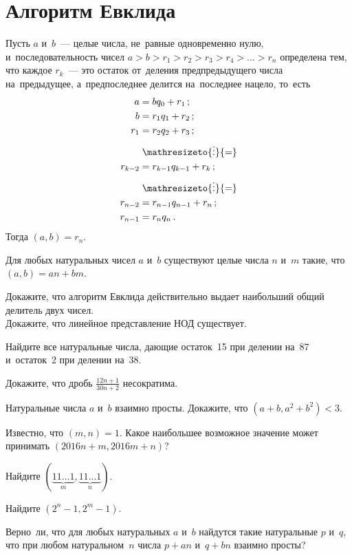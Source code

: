 
\section*{Алгоритм Евклида}


Пусть $a$ и~$b$~--- целые числа, не~равные одновременно нулю,
и~последовательность чисел
$a > b > r_{1} > r_{2} > r_{3} > r_{4} > \ldots > r_{n}$
определена тем, что каждое $r_k$~--- это остаток от~деления предпредыдущего
числа на~предыдущее, а~предпоследнее делится на~последнее нацело, то~есть
\begin{align*}
    a &= b q_0 + r_1
\, ; \\
    b &= r_1 q_1 + r_2
\, ; \\
    r_{1} &= r_2q_2 + r_3
\, ; \\ & \mathrel{\mathresizeto{\vdots}{=}} \\
    r_{k-2} &= r_{k-1} q_{k-1} + r_{k}
\, ; \\ & \mathrel{\mathresizeto{\vdots}{=}} \\
    r_{n-2} &= r_{n-1} q_{n-1} + r_n
\, ; \\
    r_{n-1} &= r_{n} q_{n}
\, . \end{align*}
Тогда $(a, b) = r_{n}$.

Для любых натуральных чисел $a$ и~$b$ существуют целые числа $n$ и~$m$ такие,
что $(a, b) = a n + b m$.

\begin{problems}

\subproblem
Докажите, что алгоритм Евклида действительно выдает наибольший общий делитель
двух чисел.
\\
\subproblem
Докажите, что линейное представление НОД существует.

\item
Найдите все натуральные числа, дающие остаток~15 при делении на~87 и~остаток~2
при делении на~38.

\item
Докажите, что дробь $\frac{12 n + 1}{30 n + 2}$ несократима.

\item
Натуральные числа $a$ и~$b$ взаимно просты.
Докажите, что $(a + b, a^2 + b^2) < 3$.

\item
Известно, что $(m, n) = 1$.
Какое наибольшее возможное значение может принимать $(2016 n + m, 2016 m + n)$?

\item
Найдите $(\underbrace{11 \ldots 1}_{m}, \underbrace{11 \ldots 1}_{n})$.

\item
Найдите $(2^{n} - 1, 2^{m} - 1)$.

\item
Верно~ли, что для любых натуральных $a$ и~$b$ найдутся такие натуральные $p$
и~$q$, что при любом натуральном~$n$ числа $p + a n$ и~$q + b n$ взаимно
просты?

\end{problems}

